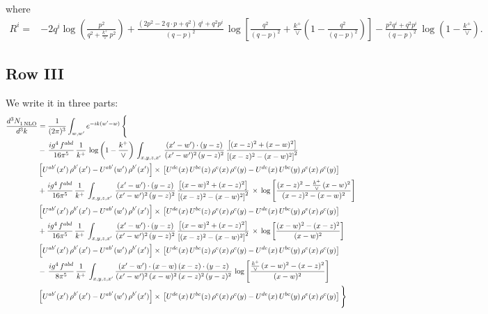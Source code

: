 \documentclass[9pt]{article}
\numberwithin{equation}{section}
\begin{document}
where
\begin{align}
R^{i} =& -2q^{i}\log\left(\frac{p^{2}}{q^{2}+\frac{k^{+}}{\vee}\,p^{2}}\right)
+\frac{(2p^{2}-2\,q\cdot p+q^{2})\,q^{i}+q^{2}p^{i}}{(q-p)^{2}}\,
\log\left[\frac{q^{2}}{(q-p)^{2}}+\frac{k^{+}}{\vee}\left(1-\frac{q^{2}}{(q-p)^{2}}\right)\right]
-\frac{p^{2}q^{i}+q^{2}p^{i}}{(q-p)^{2}}\,\log\left(1-\frac{k^{+}}{\vee}\right).
\end{align}
\subsection{Row III}
We write it in three parts:
\begin{align}
   \frac{d^{3}N_{1\,\rm NLO}^{\rm}}{d^{3}k}  & =  \frac{1}{(2\pi)^{3}}  \int_{w, w^\prime} e^{-ik(w^\prime-w)}\, \Bigg\{\notag \\
& -\,\frac{ig^{4}\,f^{abd}}{16\pi^{5}}\,\frac{1}{k^{+}}\,\log{\left(1-\frac{k^{+}}{\vee}\right)}\,\int_{x,y,z,x'}\, \frac{(x'-w')\cdot (y-z)}{(x'-w')^{2}\,(y-z)^{2}}\,\frac{\left[(x-z)^{2}+(x-w)^{2}\right]}{\left[(x-z)^{2}-(x-w)^{2}\right]^{2}}\notag \\ & \left[U^{ab'}(x')\,\rho^{b'}(x')-U^{ab'}(w')\, \rho^{b'}(x')\right]\times\, \left[U^{de}(x)\,U^{bc}(z)\, \rho^{e}(x)\,\rho^{c}(y)-U^{de}(x)\,U^{bc}(y)\,\rho^{e}(x)\,\rho^{c}(y)\right] \notag \\
&  +\frac{ig^{4}\,f^{abd}}{16\pi^{5}}\, \frac{1}{k^{+}}\,\int_{x,y,z,x'}\, \frac{(x'-w')\cdot (y-z)}{(x'-w')^{2}\,(y-z)^{2}}\, \frac{\left[(x-w)^{2}+(x-z)^{2}\right]}{\left[(x-z)^{2}-(x-w)^{2}\right]^{2}}\, \times\, \log{\left[\frac{(x-z)^{2}-\frac{k^{+}}{\vee}\,(x-w)^{2}}{(x-z)^{2}-(x-w)^{2}}\right]}\notag \\ & \left[U^{ab'}(x')\,\rho^{b'}(x')-U^{ab'}(w')\, \rho^{b'}(x')\right]\times\, \left[U^{de}(x)\,U^{bc}(z)\, \rho^{e}(x)\,\rho^{c}(y)-U^{de}(x)\,U^{bc}(y)\,\rho^{e}(x)\,\rho^{c}(y)\right] \notag \\
&  +\frac{ig^{4}\,f^{abd}}{16\pi^{5}}\, \frac{1}{k^{+}}\,\int_{x,y,z,x'}\, \frac{(x'-w')\cdot (y-z)}{(x'-w')^{2}\,(y-z)^{2}}\, \frac{\left[(x-w)^{2}+(x-z)^{2}\right]}{\left[(x-z)^{2}-(x-w)^{2}\right]^{2}}\, \times\, \log{\left[\frac{(x-w)^{2}-(x-z)^{2}}{(x-w)^{2}}\right]}\notag \\ & \left[U^{ab'}(x')\,\rho^{b'}(x')-U^{ab'}(w')\, \rho^{b'}(x')\right]\times\, \left[U^{de}(x)\,U^{bc}(z)\, \rho^{e}(x)\,\rho^{c}(y)-U^{de}(x)\,U^{bc}(y)\,\rho^{e}(x)\,\rho^{c}(y)\right] \notag \\
&-\, \frac{ig^{4}\,f^{abd}}{8\pi^{5}}\,\frac{1}{k^{+}}\,\int_{x,y,z,x'}\frac{(x'-w')\cdot (x-w)\, (x-z)\cdot (y-z)}{(x'-w')^{2}\, (x-w)^{2}\, (x-z)^{2}\, (y-z)^{2}}\,\log{\left[\frac{\frac{k^{+}}{\vee}\,(x-w)^{2}-(x-z)^{2}}{(x-w)^{2}}\right]} \notag \\ & \left[U^{ab'}(x')\,\rho^{b'}(x')-U^{ab'}(w')\, \rho^{b'}(x')\right]\times\, \left[U^{de}(x)\,U^{bc}(z)\, \rho^{e}(x)\,\rho^{c}(y)-U^{de}(x)\,U^{bc}(y)\,\rho^{e}(x)\,\rho^{c}(y)\right]\Bigg\}
\end{align}
\end{document}
